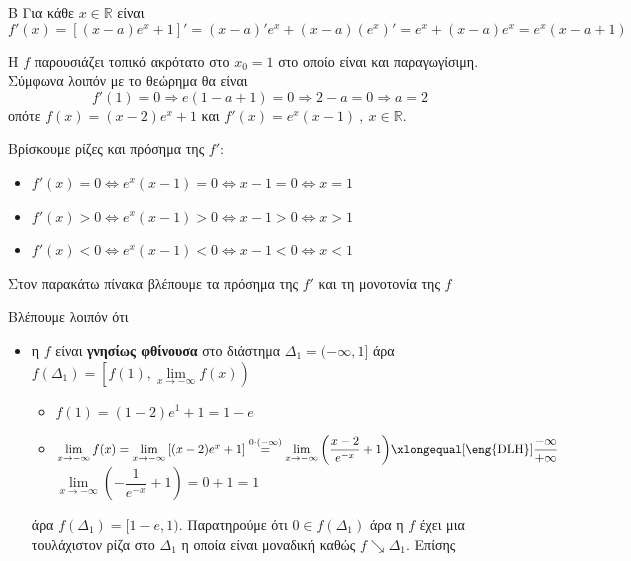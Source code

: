 \begin{thema}{Β}
Για κάθε $x\in\mathbb{R}$ είναι
\[f'(x)=\left[(x-a)e^x+1\right]'=(x-a)'e^x+(x-a)(e^x)'=e^x+(x-a)e^x=e^x(x-a+1)\]
\begin{erwthma}
\item Η $f$ παρουσιάζει τοπικό ακρότατο στο $x_0=1$ στο οποίο είναι και παραγωγίσιμη. Σύμφωνα λοιπόν με το θεώρημα  θα είναι \[f'(1)=0\Rightarrow e(1-a+1)=0\Rightarrow 2-a=0\Rightarrow a=2\]
οπότε $f(x)=(x-2)e^x+1$ και $f'(x)=e^x(x-1)\ ,\ x\in\mathbb{R}$.
\item Βρίσκουμε ρίζες και πρόσημα της $f'$:
\begin{itemize}
\item $f'(x)=0\Leftrightarrow e^x(x-1)=0\Leftrightarrow x-1=0\Leftrightarrow x=1$
\item $f'(x)>0\Leftrightarrow e^x(x-1)>0\Leftrightarrow x-1>0\Leftrightarrow x>1$
\item $f'(x)<0\Leftrightarrow e^x(x-1)<0\Leftrightarrow x-1<0\Leftrightarrow x<1$
\end{itemize}
Στον παρακάτω πίνακα βλέπουμε τα πρόσημα της $f'$ και τη μονοτονία της $f$
\begin{center}
\end{center}
Βλέπουμε λοιπόν ότι
\begin{itemize}
\item η $f$ είναι \textbf{γνησίως φθίνουσα} στο διάστημα $\varDelta_1=(-\infty,1]$ άρα $f(\varDelta_1)=\left[f(1),\lim\limits_{x\to -\infty}{f(x)}\right)$
\begin{itemize}
\item $f(1)=(1-2)e^1+1=1-e$
\item $\lim\limits_{x\to-\infty}{f(x)}=\lim\limits_{x\to -\infty}{\left[(x-2)e^x+1\right]}\stackrel{0\cdot (-\infty)}{=}\lim\limits_{x\to -\infty}{\left(\dfrac{x-2}{e^{-x}}+1\right)}\xlongequal[\text{\eng{DLH}}]{\dfrac{-\infty}{+\infty}}$$\lim\limits_{x\to-\infty}{\left(-\dfrac{1}{e^{-x}}+1\right)}=0+1=1$
\end{itemize}
άρα $f(\varDelta_1)=[1-e,1)$. Παρατηρούμε ότι $0\in f(\varDelta_1)$ άρα η $f$ έχει μια τουλάχιστον ρίζα στο $\varDelta_1$ η οποία είναι μοναδική καθώς $f\searrow\varDelta_1$. Επίσης


\end{itemize}
\end{erwthma}
\end{thema}
